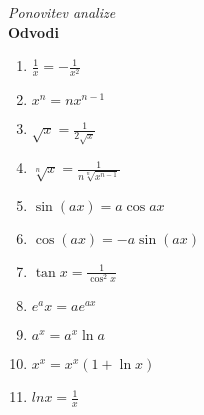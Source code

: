 \textit{Ponovitev analize}\\
\textbf{Odvodi}
\begin{center}
    \begin{small}
        \begin{enumerate}
            \item \begin{math}
                \frac{1}{x} = -\frac{1}{x^2}
            \end{math}
            \item \begin{math}
                x^n  = nx^{n-1}
            \end{math}
            \item \begin{math}
                \sqrt{x} = \frac{1}{2 \sqrt{x}}
            \end{math}
            \item \begin{math}
                \sqrt[n] x = \frac{1}{n \sqrt[n]{x^{n-1}}}
            \end{math}
            \item \begin{math}
                \sin (a x) =  a  \cos a x
            \end{math}
            \item  \begin{math}
                \cos (a x) = - a \sin (a x)
            \end{math}
            \item \begin{math}
                \tan x = \frac{1}{\cos^2 x} 
            \end{math}
            \item \begin{math}
                e^ax = ae^{ax}
            \end{math}
            \item \begin{math}
                a^x = a^x \ln a
            \end{math}
            \item \begin{math}
                x^x = x^x (1+\ln x)
            \end{math}
            \item \begin{math}
                ln x = \frac{1}{x}
            \end{math}

\end{enumerate}
\end{small}
\end{center}
